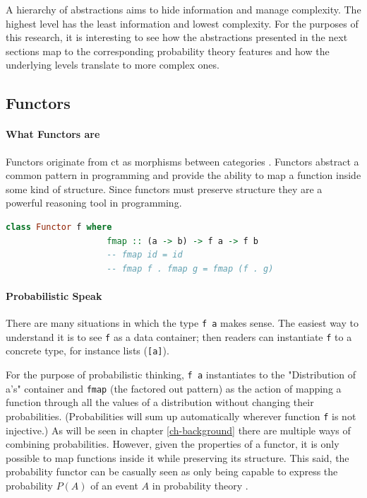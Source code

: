 \documentclass[
  oneside,
  11pt, a4paper,
  footinclude=true,
  headinclude=true,
  cleardoublepage=empty
]{scrbook}
\theoremstyle{definition}
\theoremstyle{definition}
\begin{document}
	A hierarchy of abstractions aims to hide information and manage complexity. The highest level has the least information and lowest complexity. For the purposes of this research, it is interesting to see how the abstractions presented in the next sections map to the corresponding probability theory features and how the underlying levels translate to more complex ones.
	
	    \subsection{Functors}
	    
	       \paragraph{What Functors are}
	        
	Functors originate from \gls{ct} as morphisms between categories \citep{Awodey:2010:CT:2060081}. Functors abstract a common pattern in programming and provide the ability to map a function inside some kind of structure. Since functors must preserve structure they are a powerful reasoning tool in programming.
	            
	            \begin{lstlisting}[mathescape, language=Haskell, caption={Functor laws},captionpos=b]
                class Functor f where
                    fmap :: (a -> b) -> f a -> f b
                    -- fmap id = id
                    -- fmap f . fmap g = fmap (f . g)
	            \end{lstlisting}{}
	            
	       \paragraph{Probabilistic Speak}
	        
	There are many situations in which the type \texttt{f a} makes sense. The easiest way to understand it is to see \texttt{f} as a data container; then readers can instantiate \texttt{f} to a concrete type, for instance lists (\texttt{[a]}).
	           
	For the purpose of probabilistic thinking, \texttt{f a} instantiates to the "Distribution of a's" container and \texttt{fmap} (the factored out pattern) as the action of mapping a function through all the values of a distribution without changing their probabilities. (Probabilities will sum up automatically wherever function \texttt{f} is not injective.) As will be seen in chapter \ref{ch-background} there are multiple ways of combining probabilities. However, given the properties of a functor, it is only possible to map functions inside it while preserving its structure. This said, the probability functor can be casually seen as only being capable to express the probability $P(A)$ of an event $A$ in probability theory \citep{jtobin}.
	
\end{document}
